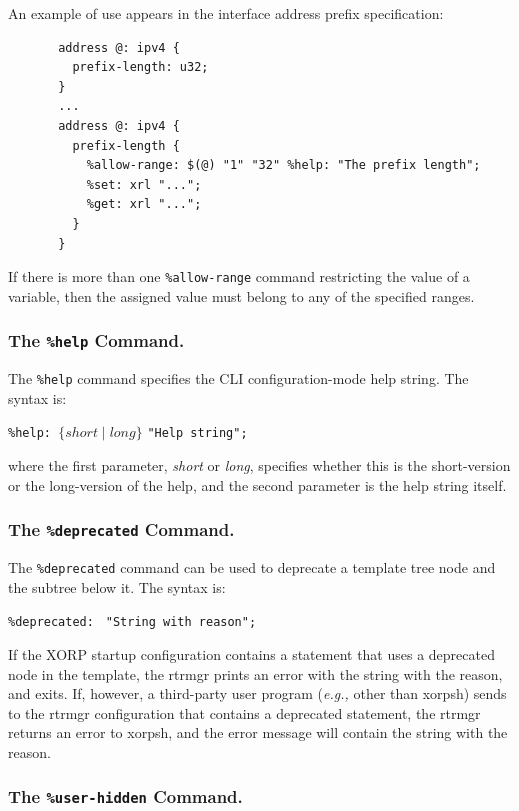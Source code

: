 \documentclass[11pt]{article}
\newcommand{\eg}{\emph{e.g.,}\xspace}
\begin{document}
An example of use appears in the interface address prefix specification:

\begin{verbatim}
       address @: ipv4 {
         prefix-length: u32;
       }
       ...
       address @: ipv4 {
         prefix-length {
           %allow-range: $(@) "1" "32" %help: "The prefix length";
           %set: xrl "...";
           %get: xrl "...";
         }
       }
\end{verbatim}

If there is more than one {\tt \%allow-range} command restricting
the value of a variable, then the assigned value must belong to any
of the specified ranges.

\subsubsection{The {\tt \%help} Command.}

The {\tt \%help} command specifies the CLI configuration-mode help string.
The syntax is:

\texttt{\%help: }{$\{short \mid long\}$} \texttt{"Help string"}\texttt{;}

\noindent where the first parameter, \textit{short} or \textit{long},
specifies whether this is the short-version or the long-version of the
help, and the second parameter is the help string itself.

\subsubsection{The {\tt \%deprecated} Command.}

The {\tt \%deprecated} command can be used to deprecate a template tree
node and the subtree below it.
The syntax is:

\texttt{\%deprecated: } \texttt{"String with reason"}\texttt{;}

If the XORP startup configuration contains a statement that uses a
deprecated node in the template, the rtrmgr prints an error with
the string with the reason, and exits.
If, however, a third-party user program (\eg other than xorpsh) sends
to the rtrmgr configuration that contains a deprecated statement, the
rtrmgr returns an error to xorpsh, and the error message will contain
the string with the reason.

\subsubsection{The {\tt \%user-hidden} Command.}
\end{document}
